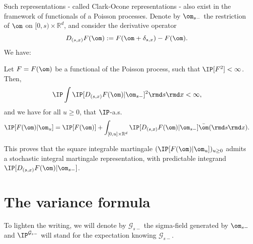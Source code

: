 Such representations - called Clark-Ocone representations - also exist in the framework of functionals of a Poisson processes. 
Denote by $\om_{s-}$ the restriction of $\om$ on $[0,s)\times\mathbb{R}^d$, and consider the derivative operator
\begin{equation}
D_{(s,x)}F(\om) := F(\om + \delta_{s,x}) - F(\om).
\end{equation}
We have:
\begin{theorem} \textup{\cite[theorem 3.1]{LAST20111588}}
Let $F=F(\om)$ be a functional of the Poisson process, such that $\IP[F^2]<\infty$. Then,
\begin{equation}
\IP \int \IP[D_{(s,x)}F(\om)|\om_{s-}]^2 \rmd s \rmd x < \infty,
\end{equation}
and we have for all $u\geq 0$, that $\IP$-a.s.
\begin{equation}
\IP[F(\om)|\om_u] = \IP[F(\om)] + \int_{[0,u]\times \mathbb{R}^d} \IP[D_{(s,x)} F(\om) | \om_{s-}] \bar \om (\rmd s \rmd x).
\end{equation}
\end{theorem}
This proves that the square integrable martingale $(\IP[F(\om)|\om_u])_{u\geq 0}$ admits a stochastic integral martingale representation, with predictable integrand $\IP[D_{(s,x)} F(\om) | \om_{s-}]$.

\section{The variance formula}
To lighten the writing, we will denote by $\mathcal{G}_{s-}$ the sigma-field generated by $\om_{s-}$ and $\IP^{\mathcal{G}_{s-}}$ will stand for the expectation knowing $\mathcal{G}_{s-}$.


